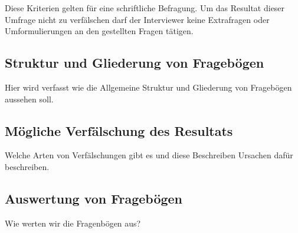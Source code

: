 Diese Kriterien gelten für eine schriftliche Befragung. Um das Resultat dieser Umfrage nicht
zu verfälschen darf der Interviewer keine Extrafragen oder Umformulierungen an den gestellten
Fragen tätigen.


\subsection{Struktur und Gliederung von Fragebögen}
Hier wird verfasst wie die Allgemeine Struktur und Gliederung von Fragebögen aussehen soll.

\subsection{Mögliche Verfälschung des Resultats}
Welche Arten von Verfälschungen gibt es und diese Beschreiben
Ursachen dafür beschreiben.

\subsection{Auswertung von Fragebögen}
Wie werten wir die Fragenbögen aus?
